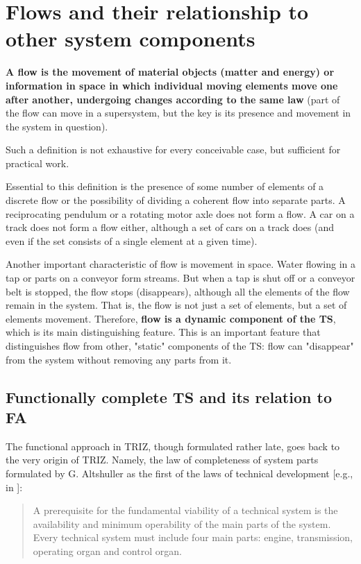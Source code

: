 \documentclass[a4paper,11pt]{article}
\begin{document}
\section{Flows and their relationship to other system components}

\textbf{A flow is the movement of material objects (matter and energy) or
  information in space in which individual moving elements move one after
  another, undergoing changes according to the same law} (part of the flow can
move in a supersystem, but the key is its presence and movement in the system
in question).

Such a definition is not exhaustive for every conceivable case, but sufficient
for practical work.

Essential to this definition is the presence of some number of elements of a
discrete flow or the possibility of dividing a coherent flow into separate
parts. A reciprocating pendulum or a rotating motor axle does not form a
flow. A car on a track does not form a flow either, although a set of cars on
a track does (and even if the set consists of a single element at a given
time).

Another important characteristic of flow is movement in space. Water flowing
in a tap or parts on a conveyor form streams. But when a tap is shut off or a
conveyor belt is stopped, the flow stops (disappears), although all the
elements of the flow remain in the system. That is, the flow is not just a set
of elements, but a set of elements movement. Therefore, \textbf{flow is a
  dynamic component of the TS}, which is its main distinguishing feature. This
is an important feature that distinguishes flow from other, "static"
components of the TS: flow can "disappear" from the system without removing
any parts from it.

\subsection{Functionally complete TS and its relation to FA}

The functional approach in TRIZ, though formulated rather late, goes back to
the very origin of TRIZ. Namely, the law of completeness of system parts
formulated by G. Altshuller as the first of the laws of technical development
[e.g., in \cite{B1}]:
\begin{quote}
  A prerequisite for the fundamental viability of a technical system is the
  availability and minimum operability of the main parts of the system. Every
  technical system must include four main parts: engine, transmission,
  operating organ and control organ.
\end{quote}
\end{document}
